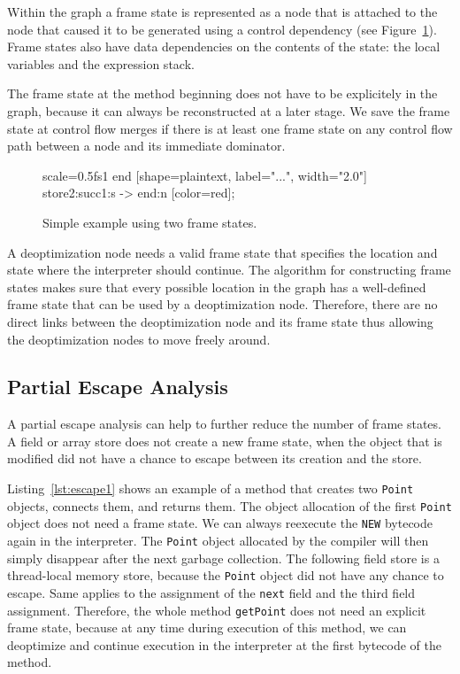 \documentclass[twocolumn]{svjour3}
\begin{document}
Within the graph a frame state is represented as a node that is attached to the node that caused it to be generated using a control dependency (see Figure~\ref{fig:fs1}).
Frame states also have data dependencies on the contents of the state: the local variables and the expression stack.

The frame state at the method beginning does not have to be explicitely in the graph, because it can always be reconstructed at a later stage.
We save the frame state at control flow merges if there is at least one frame state on any control flow path between a node and its immediate dominator.


\begin{figure}[ht]
  \centering
\begin{digraphenv}{scale=0.5}{fs1}
    end [shape=plaintext, label="...", width="2.0"]
    store2:succ1:s -> end:n [color=red];
\end{digraphenv}
  \caption{Simple example using two frame states.}
  \label{fig:fs1}
\end{figure}


A deoptimization node needs a valid frame state that specifies the location and state where the interpreter should continue.
The algorithm for constructing frame states makes sure that every possible location in the graph has a well-defined frame state that can be used by a deoptimization node.
Therefore, there are no direct links between the deoptimization node and its frame state thus allowing the deoptimization nodes to move freely around.

\subsection{Partial Escape Analysis}

A partial escape analysis can help to further reduce the number of frame states.
A field or array store does not create a new frame state, when the object that is modified did not have a chance to escape between its creation and the store.

Listing~\ref{lst:escape1} shows an example of a method that creates two \texttt{Point} objects, connects them, and returns them.
The object allocation of the first \texttt{Point} object does not need a frame state.
We can always reexecute the \texttt{NEW} bytecode again in the interpreter.
The \texttt{Point} object allocated by the compiler will then simply disappear after the next garbage collection.
The following field store is a thread-local memory store, because the \texttt{Point} object did not have any chance to escape.
Same applies to the assignment of the \texttt{next} field and the third field assignment.
Therefore, the whole method \texttt{getPoint} does not need an explicit frame state, because at any time during execution of this method, we can deoptimize and continue execution in the interpreter at the first bytecode of the method.
\end{document}
